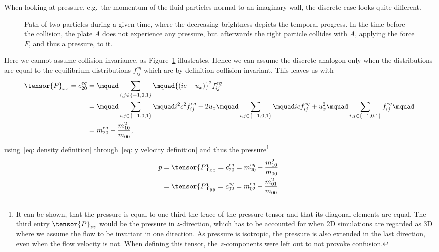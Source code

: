 When looking at pressure, e.g.\ the momentum of the fluid particles normal to an imaginary wall, the discrete case looks quite different.
\begin{figure}
\centering

\caption{Path of two particles during a given time, where the decreasing brightness depicts the temporal progress. In the time before the collision, the plate $A$ does not experience any pressure, but afterwards the right particle collides with $A$, applying the force $F$, and thus a pressure, to it.}
\label{fig: billard table}
\end{figure}
Here we cannot assume collision invariance, as Figure~\ref{fig: billard table} illustrates.
Hence we can assume the discrete analogon only when the distributions are equal to the equilibrium distributions $f_{ij}^{eq}$ which are by definition collision invariant.
This leaves us with
\begin{equation*}
  \begin{aligned}
    \tensor{P}_{xx} = c_{20}^{eq}
    & = \mquad\sum_{i,j \in \{-1,0,1\}}\mquad  {(ic - u_x)}^2 f_{ij}^{eq}
    \\ & =
    \mquad\sum_{i,j \in \{-1,0,1\}}\mquad  i^2 c^2 f_{ij}^{eq} - 2 u_x \mquad \sum_{i,j \in \{-1,0,1\}}\mquad  ic f_{ij}^{eq} + u_x^2 \mquad\sum_{i,j \in \{-1,0,1\}} f_{ij}^{eq}\mquad
    \\ & = m_{20}^{eq} - \frac{m_{10}^2}{m_{00}},
  \end{aligned}
\end{equation*}
using~\eqref{eq: density definition} through~\eqref{eq: y velocity definition} and thus the pressure\footnote{It can be shown, that the pressure is equal to one third the trace of the pressure tensor and that its diagonal elements are equal.
The third entry $\tensor{P}_{zz}$ would be the pressure in $z$-direction, which has to be accounted for when 2D simulations are regarded as 3D where we assume the flow to be invariant in one direction.
As pressure is isotropic, the pressure is also extended in the last direction, even when the flow velocity is not. When defining this tensor, the $z$-components were left out to not provoke confusion.}
\begin{equation}
  \label{eq: pressure}
  \begin{aligned}
    p &= \tensor{P}_{xx} =c_{20}^{eq}= m_{20}^{eq} - \frac{m_{10}^2}{m_{00}}\\
     &= \tensor{P}_{yy} =c_{02}^{eq} = m_{02}^{eq} - \frac{m_{01}^2}{m_{00}}.
  \end{aligned}
\end{equation}

